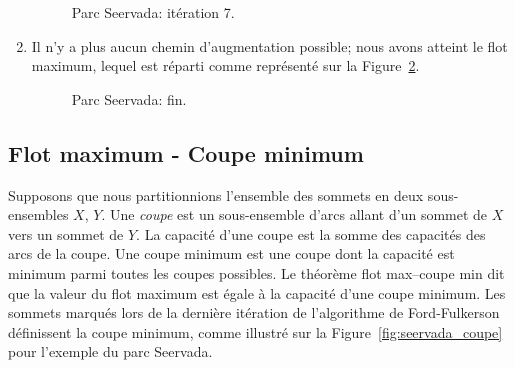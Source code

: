 \begin{example}
\begin{enumerate}
\begin{figure}[htbp]
\begin{center}
\caption{Parc Seervada: itération 7.}
\label{fig:seervada_residual_7}
\end{center}
\end{figure}
\item
Il n'y a plus aucun chemin d'augmentation possible; nous avons atteint le flot maximum, lequel est réparti comme représenté sur la Figure~\ref{fig:seervada_fin}.
\begin{figure}[htbp]
\begin{center}
\caption{Parc Seervada: fin.}
\label{fig:seervada_fin}
\end{center}
\end{figure}
\end{enumerate}
\end{example}

\subsection{Flot maximum - Coupe minimum}

Supposons que nous partitionnions l'ensemble des sommets en deux sous-ensembles $X$, $Y$.
Une {\sl coupe} est un sous-ensemble d'arcs allant d'un sommet de $X$ vers un sommet de $Y$.
La capacité d'une coupe est la somme des capacités des arcs de la coupe.
Une coupe minimum est une coupe dont la capacité est minimum parmi toutes les coupes possibles.
Le théorème flot max--coupe min dit que la valeur du flot maximum est égale à la capacité d'une coupe minimum.
Les sommets marqués lors de la dernière itération de
l'algorithme de Ford-Fulkerson définissent la coupe minimum, comme illustré sur la Figure~\ref{fig:seervada_coupe} pour l'exemple du parc Seervada.

